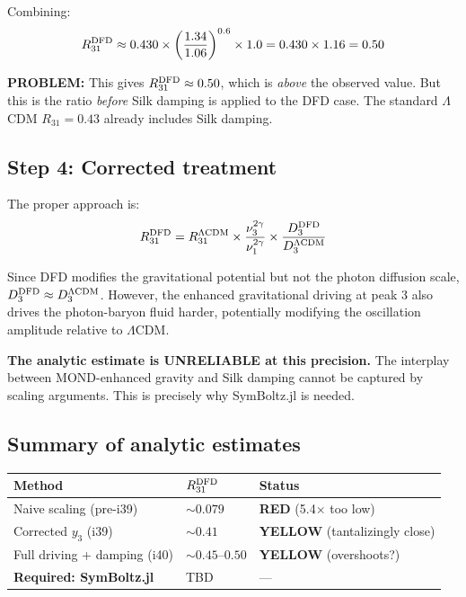 \documentclass[11pt,a4paper]{article}
\newcommand{\YELLOW}{\textcolor{dfdyellow}{\textbf{YELLOW}}}
\newcommand{\RED}{\textcolor{dfdred}{\textbf{RED}}}
\begin{document}
Combining:
\begin{equation}
R_{31}^{\rm DFD} \approx 0.430 \times \left(\frac{1.34}{1.06}\right)^{0.6} \times 1.0
= 0.430 \times 1.16 = 0.50
\end{equation}

\textbf{PROBLEM:} This gives $R_{31}^{\rm DFD} \approx 0.50$, which is \emph{above} the observed value. But this is the ratio \emph{before} Silk damping is applied to the DFD case. The standard $\Lambda$CDM $R_{31} = 0.43$ already includes Silk damping.

\subsection{Step 4: Corrected treatment}

The proper approach is:
\begin{equation}
R_{31}^{\rm DFD} = R_{31}^{\Lambda{\rm CDM}} \times \frac{\nu_3^{2\gamma}}{\nu_1^{2\gamma}} \times \frac{D_3^{\rm DFD}}{D_3^{\Lambda{\rm CDM}}}
\end{equation}

Since DFD modifies the gravitational potential but not the photon diffusion scale, $D_3^{\rm DFD} \approx D_3^{\Lambda{\rm CDM}}$. However, the enhanced gravitational driving at peak 3 also drives the photon-baryon fluid harder, potentially modifying the oscillation amplitude relative to $\Lambda$CDM.

\textbf{The analytic estimate is UNRELIABLE at this precision.} The interplay between MOND-enhanced gravity and Silk damping cannot be captured by scaling arguments. This is precisely why SymBoltz.jl is needed.

\subsection{Summary of analytic estimates}

\begin{center}
\begin{tabular}{lll}
\toprule
\textbf{Method} & $R_{31}^{\rm DFD}$ & \textbf{Status} \\
\midrule
Naive scaling (pre-i39) & $\sim 0.079$ & \RED{} (5.4$\times$ too low) \\
Corrected $y_3$ (i39) & $\sim 0.41$ & \YELLOW{} (tantalizingly close) \\
Full driving + damping (i40) & $\sim 0.45$--$0.50$ & \YELLOW{} (overshoots?) \\
\midrule
\textbf{Required: SymBoltz.jl} & TBD & --- \\
\bottomrule
\end{tabular}
\end{center}
\end{document}
